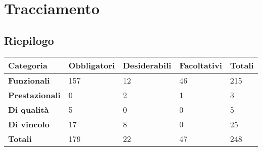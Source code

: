 %


\section{Tracciamento} %
\label{sec:tracciamento}
	
	

	\subsection{Riepilogo}

	\begin{center}

		\def\arraystretch{1.5}
		\bgroup
		\begin{longtable}{| p{2.7cm} | p{2.4cm} | p{2.4cm} | p{2.4cm} | p{1.7cm} |}

			\hline
			\textbf{Categoria} & \textbf{Obbligatori} & \textbf{Desiderabili} & \textbf{Facoltativi} & \textbf{Totali} \\
			\hline

			\textbf{Funzionali}  & 157 & 12 & 46 & 215 \\
			\hline
			\textbf{Prestazionali} & 0 & 2 & 1 & 3 \\
			\hline
			\textbf{Di qualità} & 5 & 0 & 0 & 5 \\
			\hline
			\textbf{Di vincolo} & 17 & 8 & 0 & 25 \\
			\hline
			\textbf{Totali}  & 179 & 22 & 47 & 248 \\
			\hline
		\end{longtable}
		\egroup
	\end{center}

